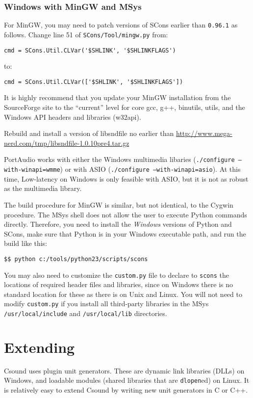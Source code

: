 \documentclass[10pt,letterpaper,onecolumn]{book}
\begin{document}
\subsubsection{Windows with MinGW and MSys}

For MinGW, you may need to patch versions of SCons earlier than \texttt{0.96.1} as follows. Change line 51 of \texttt{SCons/Tool/mingw.py} from:

\begin{lstlisting}
cmd = SCons.Util.CLVar('$SHLINK', '$SHLINKFLAGS')
\end{lstlisting}
to:
\begin{lstlisting}
cmd = SCons.Util.CLVar(['$SHLINK', '$SHLINKFLAGS']) 
\end{lstlisting}

It is highly recommend that you update your MinGW installation from the SourceForge site to the ``current'' level for core gcc, g++, binutils,  utils, and the Windows API headers and libraries (w32api).

Rebuild and install a version of libsndfile no earlier than \url{http://www.mega-nerd.com/tmp/libsndfile-1.0.10pre4.tar.gz}

PortAudio works with either the Windows multimedia libaries (\texttt{./configure ---with-winapi=wmme}) or with ASIO (\texttt{./configure ---with-winapi=asio}). At this time, Low-latency on Windows is only feasible with ASIO, but it is not as robust as the multimedia library.

The build procedure for MinGW is similar, but not identical, to the Cygwin procedure. The MSys shell does not allow the user to execute Python commands directly. Therefore, you need to install the \emph{Windows} versions of Python and SCons, make sure that Python is in your Windows executable path, and run the build like this:

\begin{lstlisting}
$$ python c:/tools/python23/scripts/scons
\end{lstlisting}

You may also need to customize the \texttt{custom.py} file to declare to \texttt{scons} the locations of required header files and libraries, since on Windows there is no standard location for these as there is on Unix and Linux. You will not need to modify \texttt{custom.py} if you install all third-party libraries in the MSys \texttt{/usr/local/include} and \texttt{/usr/local/lib} directories.

\section{Extending}
Csound uses plugin unit generators. These are dynamic link libraries (DLLs) on Windows, and loadable modules (shared libraries that are \texttt{dlopen}ed) on Linux. It is relatively easy to extend Csound by writing new unit generators in C or C++.
\end{document}
